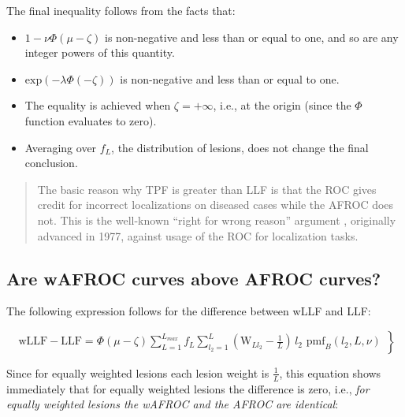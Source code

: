 \documentclass[
]{book}
\providecommand{\tightlist}{%
  \setlength{\itemsep}{0pt}\setlength{\parskip}{0pt}}
\begin{document}
The final inequality follows from the facts that:

\begin{itemize}
\tightlist
\item
  \(1 - \nu \Phi \left ( \mu - \zeta \right )\) is non-negative and less than or equal to one, and so are any integer powers of this quantity.
\item
  \(\text{exp}\left ( - \lambda \Phi \left ( - \zeta \right )\right )\) is non-negative and less than or equal to one.
\item
  The equality is achieved when \(\zeta = +\infty\), i.e., at the origin (since the \(\Phi\) function evaluates to zero).
\item
  Averaging over \(f_L\), the distribution of lesions, does not change the final conclusion.
\end{itemize}

\begin{quote}
The basic reason why TPF is greater than LLF is that the ROC gives credit for incorrect localizations on diseased cases while the AFROC does not. This is the well-known ``right for wrong reason'' argument \citep{bunch1977free}, originally advanced in 1977, against usage of the ROC for localization tasks.
\end{quote}

\hypertarget{rsm-other-predictions-wafroc-above-afroc}{%
\subsection{Are wAFROC curves above AFROC curves?}\label{rsm-other-predictions-wafroc-above-afroc}}

The following expression follows for the difference between wLLF and LLF:

\begin{equation} 
\left.
\begin{aligned}
\text{wLLF}-\text{LLF}
= \Phi\left ( \mu - \zeta \right )\sum_{L=1}^{L_{max}} f_L  \sum_{l_2=1}^{L} \left( \text{W}_{Ll_2} -\frac{1}{L} \right) \, l_2 \,\,  \text{pmf}_{B}\left ( l_2, L, \nu \right )
\end{aligned}
\right \}
\label{eq:rsm-other-predictions-wllf-llf}
\end{equation}

Since for equally weighted lesions each lesion weight is \(\frac{1}{L}\), this equation shows immediately that for equally weighted lesions the difference is zero, i.e., \emph{for equally weighted lesions the wAFROC and the AFROC are identical}:
\end{document}
